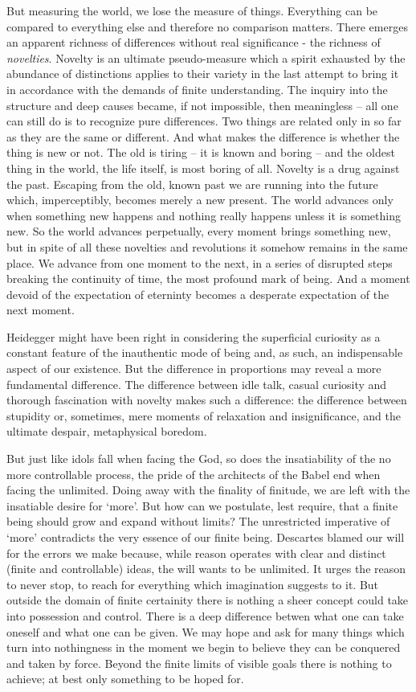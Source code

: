 But measuring the world, we lose the measure of things. Everything can be
compared to everything else and therefore no comparison matters. There 
emerges an apparent richness of differences without real significance - the
richness of {\em novelties}. Novelty is an ultimate pseudo-measure which a spirit
exhausted by the abundance of distinctions applies to their variety in the
last attempt to bring it in accordance with the demands of finite 
understanding. The inquiry into the structure and deep causes became, if not
impossible, then meaningless -- all one can still do is to recognize pure
differences. Two things are related only in so far as they are the same or
different. And what makes the difference is whether the thing is new or not.
The old is tiring -- it is known and boring -- and the oldest thing in the 
world, the life itself, is most boring of all. Novelty is a drug against the 
past. Escaping from the old, known past we are running into the future which,
imperceptibly, becomes merely a new present. The world advances only when
something new happens and nothing really happens unless it is something new.
So the world advances perpetually, every moment brings something new, but in
spite of all these novelties and revolutions it somehow remains in the same
place. We advance from one moment to the next, in a series of disrupted steps
breaking the continuity of time, the most profound mark of being. And a moment
devoid of the expectation of eterninty becomes a desperate expectation of the
next moment.

Heidegger might have been right in considering the superficial curiosity as
a constant feature of the inauthentic mode of being and, as such, an 
indispensable aspect of our existence. But the difference in proportions may
reveal a more fundamental difference. The difference between idle talk, casual
curiosity and thorough fascination with novelty makes such a difference: the
difference between stupidity or, sometimes, mere moments of relaxation and
insignificance, and the ultimate despair, metaphysical boredom.

But just like idols fall when facing the God, so does the insatiability of
the no more controllable process, the pride of the architects of the Babel
 end when facing the unlimited. Doing away with the
finality of finitude, we are left with the insatiable desire for `more'. 
But how can we postulate, lest require, that a finite being should grow and 
expand without limits? The unrestricted imperative of `more' contradicts the 
very essence of our finite being. 
Descartes
blamed our will for the errors we make because, while reason operates with
clear and distinct (finite and controllable) ideas, the will wants to be
unlimited. It urges the reason to never stop, to reach for everything which
imagination suggests to it. But outside the domain of finite certainity there
is nothing a sheer concept could take into possession and control. There is a deep
difference betwen what one can take oneself and what one can be given.
We may hope and ask for many things which turn into nothingness in the moment we 
begin to believe they can be conquered and taken by force.
Beyond the finite limits of visible goals
there is nothing to achieve; at best only something to be hoped for.

